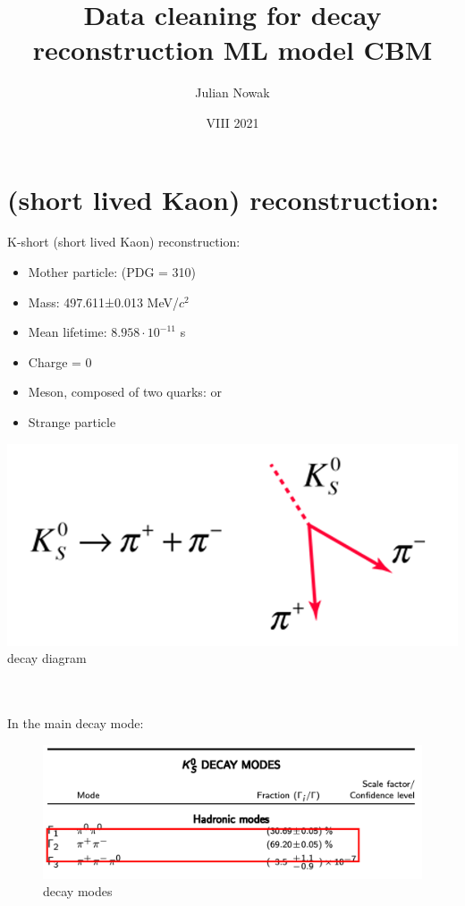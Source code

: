 \documentclass[11pt,a4paper]{article}
\title{Data cleaning for \PKshort decay reconstruction ML model CBM}
\author{Julian Nowak}
\date{VIII 2021}
\begin{document}
\maketitle
\section{\PKshort (short lived Kaon) reconstruction:}
\noindent\begin{minipage}{0.6\textwidth}
K-short (short lived Kaon) reconstruction:
\begin{itemize}
    \item Mother particle: \PKshort (PDG = 310)
    \item Mass: 497.611±0.013 MeV/$c^2$
    \item Mean lifetime: $8.958\cdot 10^{-11}$ s
    \item Charge = 0
    \item Meson, composed of two quarks: \Pdown\APstrange or \Pstrange\APdown
    \item Strange particle
\end{itemize}
\end{minipage}
\noindent\begin{minipage}{0.4\textwidth}
    \centering
    \includegraphics[width=\textwidth]{images/kdecay1.png}
    \PKshort decay diagram \cite{kdecay1}
\end{minipage}
\\\\
In the main decay mode:
\begin{figure}[H]
    \centering
    \includegraphics[width=.8\textwidth]{images/kdecay2.png}
    \caption{\PKshort decay modes \cite{kdecay2}}
    \label{fig:my_label}
\end{figure}
\end{document}
